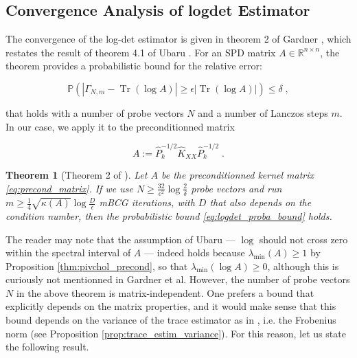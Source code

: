 \documentclass{article}
\newcommand{\R}{\mathbb R}
\DeclareMathOperator{\trace}{Tr}
\newtheorem{theorem}{Theorem}[section]
\begin{document}
\subsection{Convergence Analysis of logdet Estimator}

The convergence of the log-det estimator is given in theorem 2 of Gardner \cite{gardner_gpytorch_2021}, which restates the result of theorem 4.1 of Ubaru \cite{ubaru_fast_2017}. For an SPD matrix $A \in \R^{n\times n}$, the theorem provides a probabilistic bound for the relative error:

\begin{equation} \label{eq:logdet_proba_bound}
    \mathbb P \left( \left| \Gamma_{N, m} - \trace(\log A) \right| \ge \epsilon | \trace(\log A) | \right) \le \delta \; ,
\end{equation}

that holds with a number of probe vectors $N$ and a number of Lanczos steps $m$. In our case, we apply it to the preconditionned matrix

\begin{equation} \label{mhh je vois ceq:precond_matrix}
    A := \widehat P^{-1/2}_k \widehat K_{XX} \widehat P^{-1/2}_k \; .
\end{equation}

\begin{theorem}[{{Theorem 2 of \cite{gardner_gpytorch_2021}}}] \label{thm:gardner_logdet}
Let $A$ be the preconditionned kernel matrix \eqref{eq:precond_matrix}. If we use $N \ge \frac{32}{\epsilon^2} \log \frac{2}{\delta}$ probe vectors and run $m \ge \frac{1}{4} \sqrt{\kappa(A)} \log \frac{D}{\epsilon}$ mBCG iterations, with $D$ that also depends on the condition number, then the probabilistic bound \eqref{eq:logdet_proba_bound} holds. 
\end{theorem}

The reader may note that the assumption of Ubaru --- $\log$ should not cross zero within the spectral interval of $A$ --- indeed holds because $\lambda_{\min}(A) \ge 1$ by Proposition \ref{thm:pivchol_precond}, so that $\lambda_{\min}(\log A) \ge 0$, although this is curiously not mentionned in Gardner et al. However, the number of probe vectors $N$ in the above theorem is matrix-independent. One prefers a bound that explicitly depends on the matrix properties, and it would make sense that this bound depends on the variance of the trace estimator as in \cite{cortinovis_randomized_2021}, i.e. the Frobenius norm (see Proposition \ref{prop:trace_estim_variance}). For this reason, let us state the following result.
\end{document}

